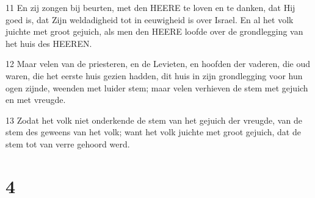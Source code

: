 \par 11 En zij zongen bij beurten, met den HEERE te loven en te danken, dat Hij goed is, dat Zijn weldadigheid tot in eeuwigheid is over Israel. En al het volk juichte met groot gejuich, als men den HEERE loofde over de grondlegging van het huis des HEEREN.
\par 12 Maar velen van de priesteren, en de Levieten, en hoofden der vaderen, die oud waren, die het eerste huis gezien hadden, dit huis in zijn grondlegging voor hun ogen zijnde, weenden met luider stem; maar velen verhieven de stem met gejuich en met vreugde.
\par 13 Zodat het volk niet onderkende de stem van het gejuich der vreugde, van de stem des geweens van het volk; want het volk juichte met groot gejuich, dat de stem tot van verre gehoord werd.

\chapter{4}

